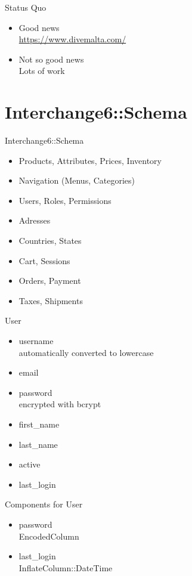\begin{frame}{Status Quo}
\begin{itemize}
\item Good news \\
\url{https://www.divemalta.com/}
\item Not so good news \\
Lots of work
\end{itemize}
\end{frame}

\section{Interchange6::Schema}
\begin{frame}{Interchange6::Schema}
\begin{itemize}
 \item Products, Attributes, Prices, Inventory 
 \item Navigation (Menus, Categories)
 \item Users, Roles, Permissions 
 \item Adresses
 \item Countries, States
 \item Cart, Sessions
 \item Orders, Payment
 \item Taxes, Shipments
\end{itemize}
\end{frame}

\begin{frame}[fragile]{User}
\begin{itemize}
\item username \\
  automatically converted to lowercase
\item email
\item password \\
  encrypted with bcrypt
\item first\_name
\item last\_name
\item active
\item last\_login
\end{itemize}
\end{frame}

\begin{frame}[fragile]{Components for User}
\begin{itemize}
\item password \\
  EncodedColumn
\item last\_login \\
  InflateColumn::DateTime
\end{itemize}
\end{frame}

